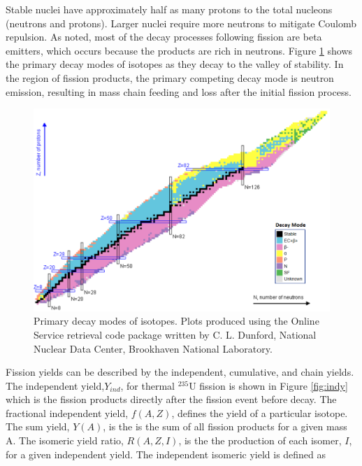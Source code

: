 Stable nuclei have approximately half as many protons to the total nucleons (neutrons and protons)\cite{Krane}. 
Larger nuclei require more neutrons to mitigate Coulomb repulsion. 
As noted, most of the decay processes following fission are beta emitters, which occurs because the products are rich in neutrons. 
Figure \ref{fig:DMode} shows the primary decay modes of isotopes as they decay to the valley of stability. 
In the region of fission products, the primary competing decay mode is neutron emission, resulting in mass chain feeding and loss after the initial fission process. 

\begin{figure}[h!]
	\includegraphics[width=\linewidth]{Figures/Chapter2/DecayModes.png}
	\caption[Primary decay modes of isotopes]{Primary decay modes of isotopes. Plots produced using the Online Service retrieval code package written by C. L. Dunford, National Nuclear Data Center, Brookhaven National Laboratory.}
	\label{fig:DMode}
\end{figure}

Fission yields can be described by the independent, cumulative, and chain yields\cite{Nichols2008}. %
The independent yield,$Y_{ind}$, for thermal $^{235}$U fission is shown in Figure \ref{fig:indy} which is the fission products directly after the fission event before decay\cite{Nichols2008}. The fractional independent yield, $f(A,Z)$, defines the yield of a particular isotope. 
The sum yield, $Y(A)$, is the is the sum of all fission products for a given mass A. 
The isomeric yield ratio, $R(A,Z,I)$, is the the production of each isomer, $I$, for a given independent yield. 
The independent isomeric yield is defined as \cite{indy}


